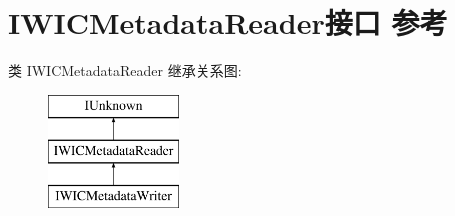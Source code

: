 \hypertarget{interface_i_w_i_c_metadata_reader}{}\section{I\+W\+I\+C\+Metadata\+Reader接口 参考}
\label{interface_i_w_i_c_metadata_reader}
类 I\+W\+I\+C\+Metadata\+Reader 继承关系图\+:\begin{figure}[H]
\begin{center}
\leavevmode
\includegraphics[height=3.000000cm]{interface_i_w_i_c_metadata_reader}
\end{center}
\end{figure}
